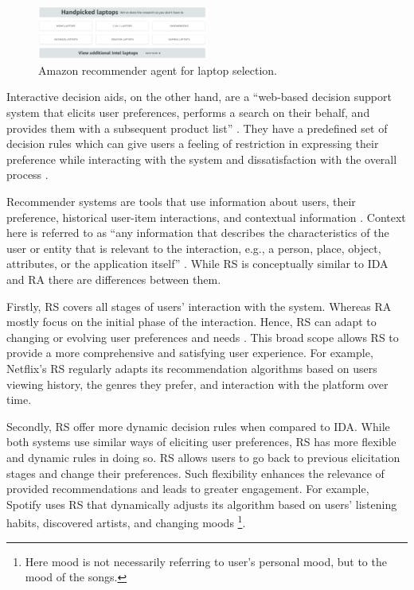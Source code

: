 \documentclass[a4paper,12pt]{article}
\begin{document}
\begin{figure}[H]
    \centering
    \includegraphics[width=0.5\textwidth]{staticFiles/amazonLaptopHandpicked.PNG}
    \caption{Amazon recommender agent for laptop selection.}
    \label{fig:amazonRA}
\end{figure}

Interactive decision aids, on the other hand, are a ``web-based decision support system that elicits user preferences, performs a search on their behalf, and provides them with a subsequent product list'' \citep{maes1999agents}. They have a predefined set of decision rules which can give users a feeling of restriction in expressing their preference while interacting with the system and dissatisfaction with the overall process \citep{wang2009interactive, silver1988user}.

Recommender systems are tools that use information about users, their preference, historical user-item interactions, and contextual information \citep{adomavicius2005toward}. Context here is referred to as ``any information that describes the characteristics of the user or entity that is relevant to the interaction, e.g., a person, place, object, attributes, or the application itself'' \citep{dey2001understanding}.  While RS is conceptually similar to IDA and RA there are differences between them.

Firstly, RS covers all stages of users' interaction with the system. Whereas RA mostly focus on the initial phase of the interaction. Hence, RS can adapt to changing or evolving user preferences and needs \citep{songWhenHowDiversify2019}. This broad scope allows RS to provide a more comprehensive and satisfying user experience. For example, Netflix's RS regularly adapts its recommendation algorithms based on users viewing history, the genres they prefer, and interaction with the platform over time.  

Secondly, RS offer more dynamic decision rules when compared to IDA. While both systems use similar ways of eliciting user preferences, RS has more flexible and dynamic rules in doing so. RS allows users to go back to previous elicitation stages and change their preferences. Such flexibility enhances the relevance of provided recommendations and leads to greater engagement. For example, Spotify uses RS that dynamically adjusts its algorithm based on users' listening habits, discovered artists, and changing moods \footnote{Here mood is not necessarily referring to user's personal mood, but to the mood of the songs.}. 
\end{document}
